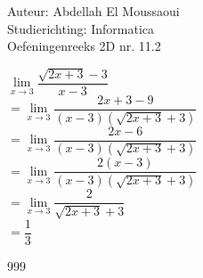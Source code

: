 \documentclass[a4paper]{article}
\begin{document}
  
\noindent \large Auteur: Abdellah El Moussaoui \\
\noindent \large Studierichting: Informatica\\
\noindent \large Oefeningenreeks 2D nr. 11.2\\

\medskip

\normalsize


$\lim\limits_{x\to3} \dfrac{\sqrt{2x+3}-3}{x-3}$\\

$= \lim\limits_{x\to3} \dfrac{2x+3-9}{\left(x-3\right)\left(\sqrt{2x+3}+3\right)}$\\

$= \lim\limits_{x\to3} \dfrac{2x-6}{\left(x-3\right)\left(\sqrt{2x+3}+3\right)}$\\

$= \lim\limits_{x\to3} \dfrac{2\left(x-3\right)}{\left(x-3\right)\left(\sqrt{2x+3}+3\right)}$\\

$= \lim\limits_{x\to3} \dfrac{2}{\sqrt{2x+3}+3}$\\

$=\dfrac{1}{3}$\\


\begin{thebibliography}{999}
\end{thebibliography}
\end{document}
